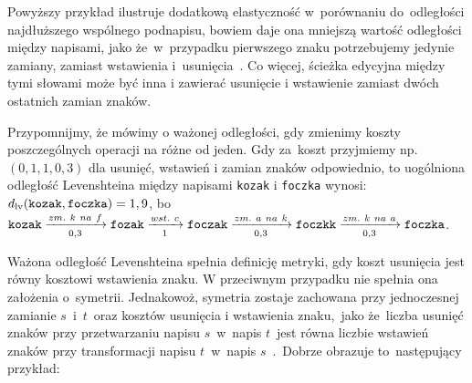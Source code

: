 \documentclass{praca1}
\begin{document}
Powyższy przykład ilustruje dodatkową elastyczność w~porównaniu do~odległości najdłuższego wspólnego podnapisu, bowiem daje ona mniejszą wartość odległości między napisami, jako że~w~przypadku pierwszego znaku potrzebujemy jedynie zamiany, zamiast wstawienia i~usunięcia~\cite{Loo2014:stringdist}. Co więcej, ścieżka edycyjna między tymi słowami może być inna i zawierać usunięcie i wstawienie zamiast dwóch ostatnich zamian znaków.


Przypomnijmy, że mówimy o ważonej odległości, gdy zmienimy koszty poszczególnych operacji na różne od jeden.
Gdy za~koszt przyjmiemy np. $(0,1, 1, 0,3)$ dla usunięć, wstawień i zamian znaków odpowiednio, to uogólniona odległość Levenshteina między napisami \verb|kozak| i \verb|foczka| wynosi: $d_{\mathrm{lv}}(\verb|kozak|, \verb|foczka|) = 1,9$, bo~$\verb|kozak|  \xrightarrow[0,3]{zm.\ k\ na\ f} \verb|fozak| \xrightarrow[1]{wst.\ c} \verb|foczak| \xrightarrow[0,3]{zm.\ a\ na\ k} \verb|foczkk| \xrightarrow[0,3]{zm.\ k\ na\ a} \verb|foczka|$.

Ważona odległość Levenshteina spełnia definicję metryki, gdy koszt usunięcia jest równy kosztowi wstawienia znaku. W przeciwnym przypadku nie spełnia ona założenia o~symetrii. Jednakowoż, symetria zostaje zachowana przy jednoczesnej zamianie $s$~i~$t$~oraz kosztów usunięcia i wstawienia znaku,~jako że~liczba usunięć znaków przy przetwarzaniu napisu $s$~w~napis $t$~jest równa liczbie wstawień znaków przy transformacji napisu $t$~w~napis $s$~\cite{Loo2014:stringdist}.~Dobrze obrazuje to~następujący przykład:
\end{document}
